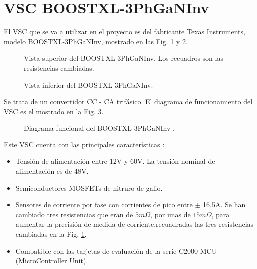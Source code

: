 \documentclass{report}
\begin{document}
\clearpage
\section{VSC BOOSTXL-3PhGaNInv} \label{sec.vscboostxl}

El VSC que se va a utilizar en el proyecto es del fabricante Texas Instruments, modelo BOOSTXL-3PhGaNInv, mostrado en las Fig. \ref{fig.vsc_superior} y \ref{fig.vsc_inferior}.

\begin{figure}[!h]
    \begin{center}
        \caption{Vista superior del BOOSTXL-3PhGaNInv. Los recuadros son las resistencias cambiadas.}\label{fig.vsc_superior}
    \end{center}
\end{figure}

\begin{figure}[!h]
    \begin{center}
        \caption{Vista inferior del BOOSTXL-3PhGaNInv.}\label{fig.vsc_inferior}
    \end{center}
\end{figure}



Se trata de un convertidor CC - CA trifásico. El diagrama de funcionamiento del VSC es el mostrado en la Fig. \ref{fig.diagramaVSC}. 
\begin{figure}[!h]
    \begin{center}
        \end{center}
        \caption{Diagrama funcional del BOOSTXL-3PhGaNInv \cite{cuarentayocho}.}
        \label{fig.diagramaVSC}
\end{figure}

Este VSC cuenta con las principales características \cite{cuarentayocho}:
\begin{itemize}
    \item Tensión de alimentación entre 12V y 60V. La tensión nominal de alimentación es de 48V.
    \item Semiconductores MOSFETs de nitruro de galio.
    \item Sensores de corriente por fase con corrientes de pico entre $\pm$ 16.5A. Se han cambiado tres resistencias que eran de $5m\Omega$, por unas de $15m\Omega$, para aumentar la precisión de medida de corriente,recuadradas las tres resistencias cambiadas en la Fig. \ref{fig.vsc_superior}.
    \item Compatible con las tarjetas de evaluación de la serie C2000 MCU  (MicroController Unit).
\end{itemize}
\end{document}
